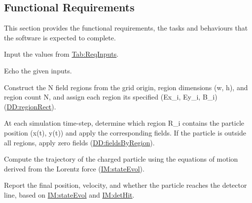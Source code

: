 \documentclass[12pt]{article}
\begin{document}
\subsection{Functional Requirements}
\label{Sec:FRs}
This section provides the functional requirements, the tasks and behaviours that the software is expected to complete.

\begin{description}[font=\normalfont]
\item[Input-Values:\phantomsection\label{inputValues}]{Input the values from \hyperref[Table:ReqInputs]{Tab:ReqInputs}.}
\item[Echo-Inputs:\phantomsection\label{echoInputs}]{Echo the given inputs.}
\item[Build-Region-Grid:\phantomsection\label{buildRegionGrid}]{Construct the N field regions from the grid origin, region dimensions (w, h), and region count N, and assign each region its specified (Ex\_i, Ey\_i, B\_i) (\hyperref[DD:regionRect]{DD:regionRect}).}
\item[Lookup-Active-Region:\phantomsection\label{lookupActiveRegion}]{At each simulation time-step, determine which region R\_i contains the particle position (x(t), y(t)) and apply the corresponding fields. If the particle is outside all regions, apply zero fields (\hyperref[DD:fieldsByRegion]{DD:fieldsByRegion}).}
\item[Compute-Trajectory:\phantomsection\label{computeTraj}]{Compute the trajectory of the charged particle using the equations of motion derived from the Lorentz force (\hyperref[IM:stateEvol]{IM:stateEvol}).}
\item[Report-Outputs:\phantomsection\label{reportOutputs}]{Report the final position, velocity, and whether the particle reaches the detector line, based on \hyperref[IM:stateEvol]{IM:stateEvol} and \hyperref[IM:detHit]{IM:detHit}.}
\end{description}
\end{document}
